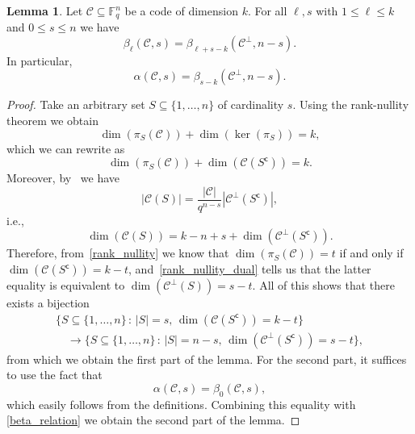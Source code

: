 \documentclass[11pt,a4paper,reqno,twoside]{article}
\theoremstyle{definition}
\newtheorem{lemma}[theorem]{Lemma}
\newcommand{\F}{\mathbb{F}}
\begin{document}
\begin{lemma} \label{duality_lemma}
    Let $\mathcal{C} \subseteq \F_q^n$ be
    a code of dimension $k$. For all $\ell, s$ with
    $1 \le \ell \le k$ and $0 \le s \le n$ we have
    \begin{equation} \label{beta_relation}
    \beta_{\ell}(\mathcal{C},s) = \beta_{\ell+s-k}(\mathcal{C}^\perp,n-s).
    \end{equation}
    In particular,
    \[ 
    \alpha(\mathcal{C}, s) = \beta_{s-k}(\mathcal{C}^{\perp},n-s).
    \]
\end{lemma}
\begin{proof}
    Take an arbitrary set $S \subseteq \{1, \ldots, n\}$ of cardinality $s$. Using the rank-nullity theorem we obtain
    \begin{equation} \label{rank_nullity}
    \dim(\pi_S(\mathcal{C})) + \dim(\ker(\pi_S)) = k,
    \end{equation}
    which we can rewrite as
    \begin{equation} \label{rank_nullity_2}
        \dim(\pi_S(\mathcal{C})) + \dim(\mathcal{C}(S^{\mathsf{c}})) = k.
    \end{equation} 
    Moreover, by~\cite[Theorem~24]{ravagnani} we have 
    \[
    |\mathcal{C}(S)| = \frac{|\mathcal{C}|}{q^{n-s}} |\mathcal{C}^{\perp}(S^{\mathsf{c}})|,
    \]
    i.e.,
    \begin{equation} \label{rank_nullity_dual}
    \dim(\mathcal{C}(S)) = k-n+s+\dim(\mathcal{C}^{\perp}(S^{\mathsf{c}})).
    \end{equation}
    Therefore, from~\eqref{rank_nullity} we know that $\dim(\pi_S(\mathcal{C})) = t$ if and only if $\dim(\mathcal{C}(S^{\mathsf{c}})) = k-t$, and~\eqref{rank_nullity_dual} tells us that
    the latter equality is equivalent to $\dim(\mathcal{C}^{\perp}(S)) = s-t$. All of this shows that there exists a bijection
    \begin{multline*}
    \{ S \subseteq  \{1, \ldots, n\} \, : \,  |S| = s, \, \dim(\mathcal{C}(S^{\mathsf{c}})) = k-t \} \\  \quad \to \{ S \subseteq \{1, \ldots, n\} \, : \, |S| = n-s, \, \dim(\mathcal{C}^{\perp}(S^{\mathsf{c}})) = s-t  \},
    \end{multline*}
    from which we obtain the first part of the lemma. For the second part, it suffices to use the fact that
    \begin{equation} \label{dual_eq_alpha_beta0}
        \alpha(\mathcal{C},s) = \beta_0(\mathcal{C},s),
    \end{equation}
    which easily follows from the definitions.
    Combining this equality with \eqref{beta_relation} we obtain the second part of the lemma.
\end{proof} 
\end{document}
